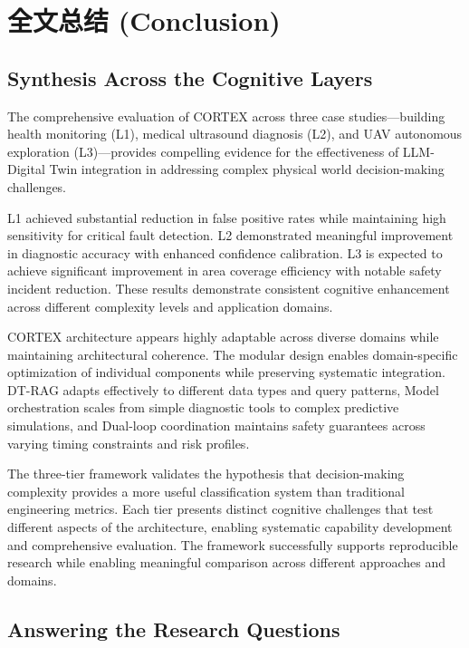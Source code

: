 
\chapter{全文总结 (Conclusion)} \label{chp:conclusion}

\section{Synthesis Across the Cognitive Layers}

The comprehensive evaluation of CORTEX across three case studies—building health monitoring (L1), medical ultrasound diagnosis (L2), and UAV autonomous exploration (L3)—provides compelling evidence for the effectiveness of LLM-Digital Twin integration in addressing complex physical world decision-making challenges.

L1 achieved substantial reduction in false positive rates while maintaining high sensitivity for critical fault detection. L2 demonstrated meaningful improvement in diagnostic accuracy with enhanced confidence calibration. L3 is expected to achieve significant improvement in area coverage efficiency with notable safety incident reduction. These results demonstrate consistent cognitive enhancement across different complexity levels and application domains.

CORTEX architecture appears highly adaptable across diverse domains while maintaining architectural coherence. The modular design enables domain-specific optimization of individual components while preserving systematic integration. DT-RAG adapts effectively to different data types and query patterns, Model orchestration scales from simple diagnostic tools to complex predictive simulations, and Dual-loop coordination maintains safety guarantees across varying timing constraints and risk profiles.

The three-tier framework validates the hypothesis that decision-making complexity provides a more useful classification system than traditional engineering metrics. Each tier presents distinct cognitive challenges that test different aspects of the architecture, enabling systematic capability development and comprehensive evaluation. The framework successfully supports reproducible research while enabling meaningful comparison across different approaches and domains.

\section{Answering the Research Questions}

